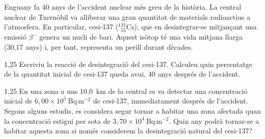 Enguany fa 40 anys de l'accident nuclear més greu de la història. La central nuclear de Txernòbil va alliberar una gran quantitat de materials radioactius a l'atmosfera. En particular, cesi-137 (${}^{137}_{\phantom{1}55}\mathrm{Cs}$), que en desintegrar-se mitjançant una emissió $\beta^-$ genera un nucli de bari. Aquest isòtop té una vida mitjana llarga (30,17 anys) i, per tant, representa un perill durant dècades.

\begin{apartat}{1,25}
Escriviu la reacció de desintegració del cesi-137. Calculeu quin percentatge de la quantitat inicial de cesi-137 queda avui, 40 anys després de l'accident.
\end{apartat}

\begin{apartat}{1,25}
En una zona a uns 10,0~km de la central es va detectar una concentració inicial de $6,00\times 10^{5}\ \mathrm{Bq\,m^{-2}}$ de cesi-137, immediatament després de l'accident. Segons alguns estudis, es considera segur tornar a habitar una zona afectada quan la concentració estigui per sota de $3,70\times 10^{4}\ \mathrm{Bq\,m^{-2}}$. Quin any podrà tornar-se a habitar aquesta zona si només considerem la desintegració natural del cesi-137?
\end{apartat}
